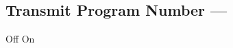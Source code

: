 \subsection[Transmit Pgm Number]{Transmit Program Number --- \UiKey{\SET}}









































Off
On

